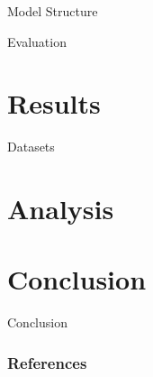 \documentclass[usenames,dvipsnames,pdf]{beamer}
\begin{document}
        \begin{frame}{Model Structure}
          
        \end{frame}

        \begin{frame}{Evaluation}
          
        \end{frame}
        
        \section{Results}

        \begin{frame}{Datasets}
          
        \end{frame}

        
        \section{Analysis}
        
        \section{Conclusion}

        \begin{frame}{Conclusion}
        \end{frame}

        \begin{frame}[allowframebreaks]
          \frametitle{References}
          
          
        \end{frame}
      
\end{document}
